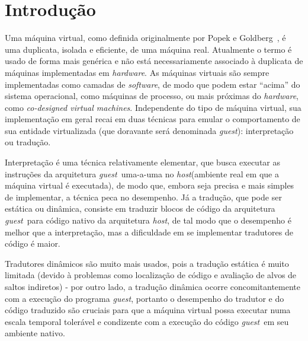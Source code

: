 \documentclass[12pt,twoside]{article}
\newcommand{\guest}{\emph{guest}}
\newcommand{\host}{\emph{host}}
\newcommand{\qq}[1]{``#1''}
\begin{document}
\section{Introdução}
Uma máquina virtual, como definida originalmente por Popek e Goldberg~\cite{PG74}, é uma duplicata, isolada e eficiente, de uma máquina real. Atualmente o termo é usado de forma mais genérica e não está necessariamente associado à duplicata de máquinas implementadas em \emph{hardware}.  As máquinas virtuais são sempre implementadas como camadas de \emph{software}, de modo que podem estar \qq{acima} do sistema operacional, como máquinas de processo, ou mais próximas do \emph{hardware}, como \emph{co-designed virtual machines}. Independente do tipo de máquina virtual, sua implementação em geral recai em duas técnicas para emular o comportamento de sua entidade virtualizada (que doravante será denominada \guest): interpretação ou tradução. 

Interpretação é uma técnica relativamente elementar, que busca executar as instruções da arquitetura \guest~uma-a-uma no \host (ambiente real em que a máquina virtual é executada), de modo que, embora seja precisa e mais simples de implementar, a técnica peca no desempenho. Já a tradução, que pode ser estática ou dinâmica, consiste em traduzir blocos de código da arquitetura \guest~para código nativo da arquitetura \host, de tal modo que o desempenho é melhor que a interpretação, mas a dificuldade em se implementar tradutores de código é maior.

Tradutores dinâmicos são muito mais usados, pois a tradução estática é muito limitada (devido à problemas como localização de código e avaliação de alvos de saltos indiretos) - por outro lado, a tradução dinâmica ocorre concomitantemente com a execução do programa \guest, portanto o desempenho do tradutor e do código traduzido são cruciais para que a máquina virtual possa executar numa escala temporal tolerável e condizente com a execução do código \guest~em seu ambiente nativo.
\end{document}
